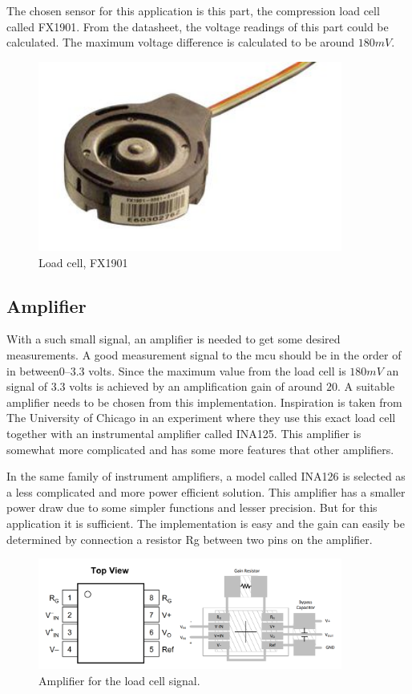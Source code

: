 The chosen sensor for this application is this part, the compression load cell called FX1901\cite{load_cell}.  
From the datasheet, the voltage readings of this part could be calculated. The maximum voltage difference is calculated to be around $180mV$. 

\begin{figure}[H]
\begin{center}
	\includegraphics[width = 10cm]{Figures/Load_cell.png}
	\caption{Load cell, FX1901}
	\label{Load_cell}
\end{center}
\end{figure}


\subsection{Amplifier}
With a such small signal, an amplifier is needed to get some desired measurements. A good measurement signal to the \gls{mcu} should be in the order of in between$0–3.3$ volts. Since the maximum value from the load cell is $180mV$ an signal of $3.3$ volts is achieved by an amplification gain of around $20$.  
A suitable amplifier needs to be chosen from this implementation. Inspiration is taken from The University of Chicago\cite{UoC} in an experiment where they use this exact load cell together with an instrumental amplifier called INA125. This amplifier is somewhat more complicated and has some more features that other amplifiers.  

In the same family of instrument amplifiers, a model called INA126\cite{ina_126} is selected as a less complicated and more power efficient solution.  
This amplifier has a smaller power draw due to some simpler functions and lesser precision. But for this application it is sufficient.  
The implementation is easy and the gain can easily be determined by connection a resistor Rg between two pins on the amplifier. 

\begin{figure}[H]
\begin{center}
	\includegraphics[width = 10cm]{Figures/INA126_pinout.png}
	\caption{Amplifier for the load cell signal.}
	\label{INA126}
\end{center}
\end{figure}

